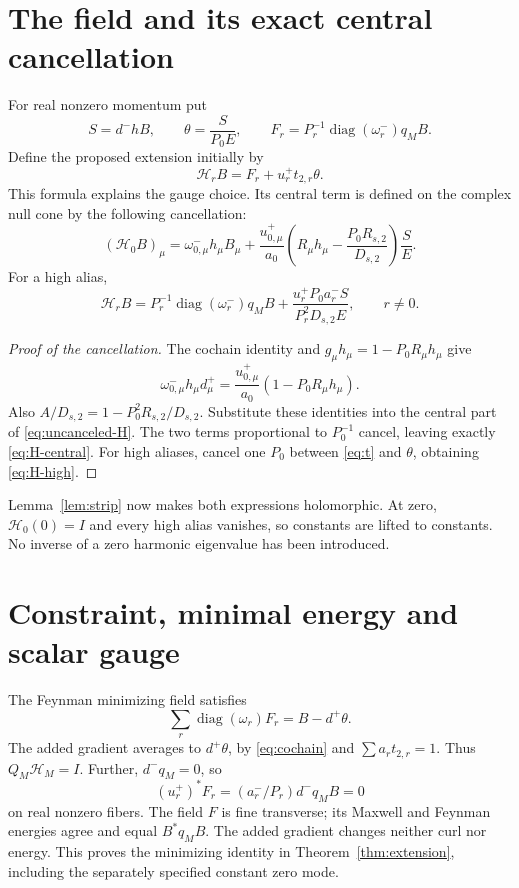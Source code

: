 \documentclass[11pt]{article}
\theoremstyle{remark}
\newcommand{\diag}{\operatorname{diag}}
\newcommand{\HH}{\mathcal H}
\begin{document}
\section{The field and its exact central cancellation}

For real nonzero momentum put
\[
 S=d^-hB,\qquad \theta=\frac{S}{P_0E},\qquad
 F_r=P_r^{-1}\diag(\omega_r^-)q_MB.
\]
Define the proposed extension initially by
\begin{equation}\label{eq:uncanceled-H}
 \HH_rB=F_r+u_r^+t_{2,r}\theta.
\end{equation}
This formula explains the gauge choice. Its central term is defined
on the complex null cone by the following cancellation:
\begin{equation}\label{eq:H-central}
 (\HH_0B)_\mu=\omega_{0,\mu}^-h_\mu B_\mu+
 \frac{u_{0,\mu}^+}{a_0}
       \left(R_\mu h_\mu-\frac{P_0R_{s,2}}{D_{s,2}}\right)
       \frac{S}{E}.
\end{equation}
For a high alias,
\begin{equation}\label{eq:H-high}
 \HH_rB=P_r^{-1}\diag(\omega_r^-)q_MB
       +\frac{u_r^+P_0a_r^-S}{P_r^2D_{s,2}E},\qquad r\ne0.
\end{equation}

\begin{proof}[Proof of the cancellation]
The cochain identity and $g_\mu h_\mu=1-P_0R_\mu h_\mu$ give
\[
 \omega_{0,\mu}^-h_\mu d_\mu^+
       =\frac{u_{0,\mu}^+}{a_0}(1-P_0R_\mu h_\mu).
\]
Also $A/D_{s,2}=1-P_0^2R_{s,2}/D_{s,2}$. Substitute these
identities into the central part of \eqref{eq:uncanceled-H}.
The two terms proportional to $P_0^{-1}$ cancel, leaving exactly
\eqref{eq:H-central}. For high aliases, cancel one $P_0$ between
\eqref{eq:t} and $\theta$, obtaining \eqref{eq:H-high}.
\end{proof}

Lemma~\ref{lem:strip} now makes both expressions holomorphic.
At zero, $\HH_0(0)=I$ and every high alias vanishes, so constants
are lifted to constants. No inverse of a zero harmonic eigenvalue
has been introduced.

\section{Constraint, minimal energy and scalar gauge}\label{sec:gauge}

The Feynman minimizing field satisfies
\[
 \sum_r\diag(\omega_r)F_r=B-d^+\theta.
\]
The added gradient averages to $d^+\theta$, by
\eqref{eq:cochain} and $\sum a_rt_{2,r}=1$. Thus $Q_M\HH_M=I$.
Further, $d^-q_M=0$, so
\[
 (u_r^+)^*F_r=(a_r^-/P_r)d^-q_MB=0
\]
on real nonzero fibers. The field $F$ is fine transverse; its
Maxwell and Feynman energies agree and equal $B^*q_MB$.
The added gradient changes neither curl nor energy. This proves
the minimizing identity in Theorem~\ref{thm:extension}, including
the separately specified constant zero mode.
\end{document}
